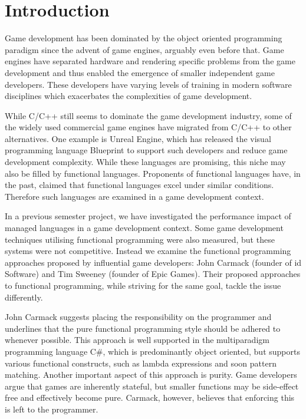 \chapter{Introduction} \label{chap:introduction}
Game development has been dominated by the object oriented programming paradigm since the advent of game engines\cite{anderson2011:scripting-classes}, arguably even before that. Game engines have separated hardware and rendering specific problems from the game development and thus enabled the emergence of smaller independent game developers\cite{michael2003indie}. These developers have varying levels of training in modern software disciplines\cite{mcgill2009defining, hewner2010game} which exacerbates the complexities of game development\cite{blow2004game}.

While C/C++ still seems to dominate the game development industry\cite{wikipedia:list:of:game:engines}, some of the widely used commercial game engines have migrated from C/C++ to other alternatives. One example is Unreal Engine, which has released the visual programming language Blueprint\cite{unreal:blueprint:intro} to support such developers and reduce game development complexity\cite{unreal:blueprint:overview}. While these languages are promising, this niche may also be filled by functional languages. Proponents of functional languages have, in the past, claimed that functional languages excel under similar conditions\cite{kemerer2009impact, hughes1989functional, hu2015functional}. Therefore such languages are examined in a game development context.

In a previous semester project, we have investigated the performance impact of managed languages in a game development context\cite{p92018gameplay}. Some game development techniques utilising functional programming were also measured, but these systems were not competitive. Instead we examine the functional programming approaches proposed by influential game developers: John Carmack (founder of id Software) and Tim Sweeney (founder of Epic Games). Their proposed approaches to functional programming, while striving for the same goal, tackle the issue differently.


John Carmack suggests placing the responsibility on the programmer and underlines that the pure functional programming style should be adhered to whenever possible\cite{gamasutra:c++functional}. This approach is well supported in the multiparadigm programming language C\#, which is predominantly object oriented, but supports various functional constructs, such as lambda expressions\cite{csharp:lambda} and soon pattern matching\cite{csharp:pattern:matching}. Another important aspect of this approach is purity. Game developers argue that games are inherently stateful\cite{games:stateful}, but smaller functions may be side-effect free and effectively become pure. Carmack, however, believes that enforcing this is left to the programmer.

